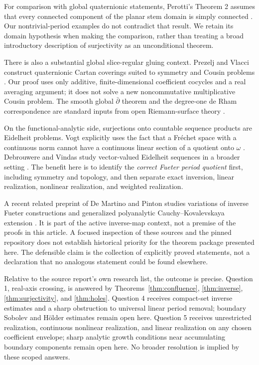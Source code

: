 \documentclass[11pt,a4paper]{article}
\numberwithin{equation}{section}
\theoremstyle{definition}
\theoremstyle{remark}
\begin{document}
For comparison with global quaternionic statements, Perotti's Theorem 2
assumes that every connected component of the planar stem domain is simply
connected \cite{perotti}. Our nontrivial-period examples do not contradict
that result. We retain its domain hypothesis when making the comparison,
rather than treating a broad introductory description of surjectivity as an
unconditional theorem.

There is also a substantial global slice-regular gluing context. Prezelj and
Vlacci construct quaternionic Cartan coverings suited to symmetry and Cousin
problems \cite{prezelj}. Our proof uses only additive, finite-dimensional
coefficient cocycles and a real averaging argument; it does not solve a new
noncommutative multiplicative Cousin problem. The smooth global
$\bar\partial$ theorem and the degree-one de Rham correspondence are standard
inputs from open Riemann-surface theory \cite{forster}.

On the functional-analytic side, surjections onto countable sequence products
are Eidelheit problems. Vogt explicitly uses the fact that a Fr\'echet space
with a continuous norm cannot have a continuous linear section of a quotient
onto $\omega$ \cite{vogt}. Debrouwere and Vindas study vector-valued Eidelheit
sequences in a broader setting \cite{debrouwere}. The benefit here is to
identify the \emph{correct Fueter period quotient} first, including symmetry
and topology, and then separate exact inversion, linear realization, nonlinear
realization, and weighted realization.

A recent related preprint of De Martino and Pinton studies variations of
inverse Fueter constructions and generalized polyanalytic
Cauchy--Kovalevskaya extension \cite{demartino2026}. It is part of the active
inverse-map context, not a premise of the proofs in this article. A focused
inspection of these sources and the pinned repository does not establish
historical priority for the theorem package presented here. The defensible
claim is the collection of explicitly proved statements, not a declaration
that no analogous statement could be found elsewhere.

Relative to the source report's own research list, the outcome is precise.
Question 1, real-axis crossing, is answered by
Theorems~\ref{thm:confluence}, \ref{thm:inverse}, \ref{thm:surjectivity}, and
\ref{thm:holes}. Question 4 receives compact-set inverse estimates and a
sharp obstruction to universal linear period removal; boundary Sobolev and
H\"older estimates remain open here. Question 5 receives unrestricted
realization, continuous nonlinear realization, and linear realization on
any chosen coefficient envelope; sharp analytic growth conditions near
accumulating boundary components remain open here. No broader resolution is
implied by these scoped answers.
\end{document}
